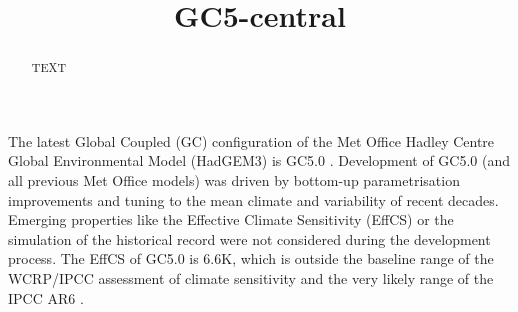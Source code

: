 \documentclass[gmd, manuscript]{copernicus}
\begin{document}
\title{GC5-central}















\received{}
\pubdiscuss{} %
\revised{}
\accepted{}
\published{}




\maketitle



\begin{abstract}
TEXT
\end{abstract}




\introduction  %
The latest Global Coupled (GC) configuration of the Met Office Hadley Centre Global Environmental Model (HadGEM3) is GC5.0 \citep{xavier25gc5}.
Development of GC5.0 (and all previous Met Office models) was driven by bottom-up parametrisation improvements and tuning to the mean climate and variability of recent decades.
Emerging properties like the Effective Climate Sensitivity (EffCS) or the simulation of the historical record were not considered during the development process.
The EffCS of GC5.0 is 6.6K, which is outside the baseline range of the WCRP/IPCC assessment of climate sensitivity \citep{sherwood20} and the very likely range of the IPCC AR6 \citep{ipcc21}.
\end{document}
